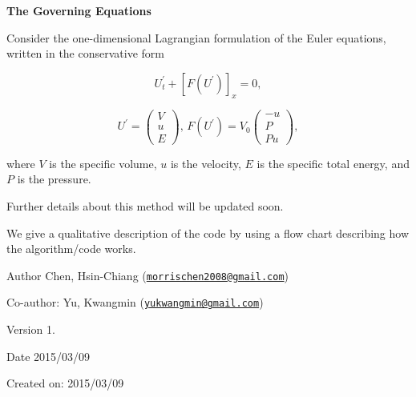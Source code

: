 {\bfseries  The Governing Equations }\par
 Consider the one-\/dimensional Lagrangian formulation of the Euler equations, written in the conservative form

\[ U_{t}^{'} + \left[ F(U^{'}) \right]_{x} = 0, \]

\[ U^{'} = \left( \begin{array} {c} V \\ u \\ E \end{array} \right), \, F(U^{'}) = V_{0} \left( \begin{array} {c} -u \\ P \\ Pu \end{array} \right), \]

where $V$ is the specific volume, $u$ is the velocity, $E$ is the specific total energy, and $P$ is the pressure.\par
 Further details about this method will be updated soon.\par


We give a qualitative description of the code by using a flow chart describing how the algorithm/code works.



\begin{DoxyAuthor}{Author}
Chen, Hsin-\/\-Chiang (\href{mailto:morrischen2008@gmail.com}{\tt morrischen2008@gmail.\-com})
\end{DoxyAuthor}
Co-\/author\-: Yu, Kwangmin (\href{mailto:yukwangmin@gmail.com}{\tt yukwangmin@gmail.\-com})

\begin{DoxyVersion}{Version}
1.
\end{DoxyVersion}
\begin{DoxyDate}{Date}
2015/03/09
\end{DoxyDate}
Created on\-: 2015/03/09 